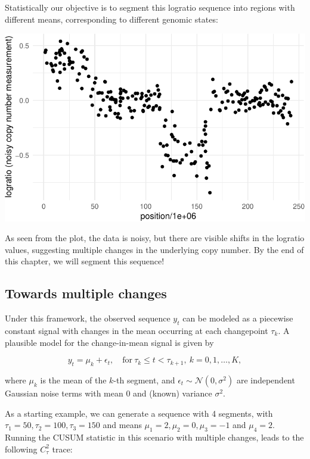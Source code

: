 \documentclass[
  letterpaper,
  DIV=11,
  numbers=noendperiod]{scrreprt}
\begin{document}
Statistically our objective is to segment this logratio sequence into
regions with different means, corresponding to different genomic states:

\includegraphics{3_multiple_changes_files/figure-pdf/unnamed-chunk-2-1.pdf}

As seen from the plot, the data is noisy, but there are visible shifts
in the logratio values, suggesting multiple changes in the underlying
copy number. By the end of this chapter, we will segment this sequence!

\subsection{Towards multiple changes}\label{towards-multiple-changes}

Under this framework, the observed sequence \(y_t\) can be modeled as a
piecewise constant signal with changes in the mean occurring at each
changepoint \(\tau_k\). A plausible model for the change-in-mean signal
is given by

\[
y_t = \mu_k + \epsilon_t, \quad \text{for} \ \tau_k \leq t < \tau_{k+1}, \ k = 0, 1, \dots, K,
\]

where \(\mu_k\) is the mean of the \(k\)-th segment, and
\(\epsilon_t \sim \mathcal{N}(0, \sigma^2)\) are independent Gaussian
noise terms with mean 0 and (known) variance \(\sigma^2\).

As a starting example, we can generate a sequence with 4 segments, with
\(\tau_1 = 50, \tau_2 = 100, \tau_3 = 150\) and means
\(\mu_1 = 2, \mu_2 = 0, \mu_3 = -1\) and \(\mu_4 = 2\). Running the
CUSUM statistic in this scenario with multiple changes, leads to the
following \(C_\tau^2\) trace:
\end{document}
